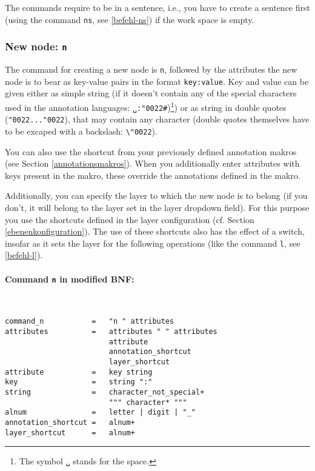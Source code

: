 \documentclass[12pt]{scrartcl}
\newcommand{\quo}{\char"0022}
\begin{document}
The commands require to be in a sentence, i.e., you have to create a sentence first (using the command \texttt{ns}, see \ref{befehl-ns}) if the work space is empty.


\subsubsection{New node: \texttt{n}}\label{befehl-n}

The command for creating a new node is \texttt{n}, followed by the attributes the new node is to bear as key-value pairs in the format \texttt{key:value}.
Key and value can be given either as simple string (if it doesn’t contain any of the special characters used in the annotation languages: \texttt{␣:\quo\#})\footnote{The symbol \texttt{␣} stands for the space.}) or as string in double quotes (\texttt{\quo...\quo}), that may contain any character (double quotes themselves have to be excaped with a backslash: \texttt{\textbackslash\quo}).

You can also use the shortcut from your previously defined annotation makros (see Section \ref{annotationsmakros}).
When you additionally enter attributes with keys present in the makro, these override the annotations defined in the makro.

Additionally, you can specify the layer to which the new node is to belong (if you don’t, it will belong to the layer set in the layer dropdown field).
For this purpose you use the shortcuts defined in the layer configuration (cf. Section \ref{ebenenkonfiguration}).
The use of these shortcuts also has the effect of a switch, insofar as it sets the layer for the following operations (like the command \texttt{l}, see \ref{befehl-l}).

\paragraph*{Command \texttt{n} in modified BNF:}
~
\begin{framed}
\begin{lstlisting}
command_n           =   "n " attributes
attributes          =   attributes " " attributes
                        attribute
                        annotation_shortcut
                        layer_shortcut
attribute           =   key string
key                 =   string ":"
string              =   character_not_special+
                        """ character* """
alnum               =   letter | digit | "_"
annotation_shortcut =   alnum+
layer_shortcut      =   alnum+
\end{lstlisting}
\end{framed}
\end{document}
